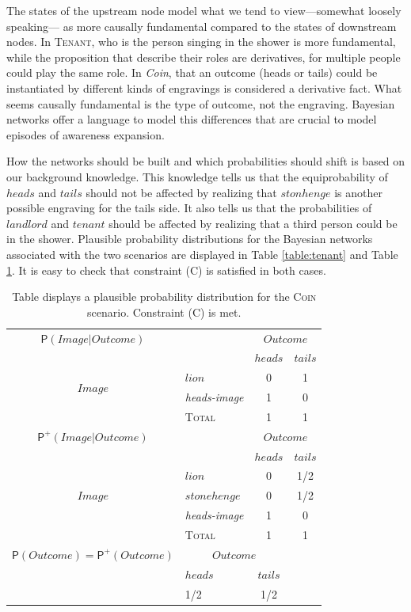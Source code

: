 \documentclass[
  11pt,
  dvipsnames,enabledeprecatedfontcommands]{scrartcl}
\newcommand{\pr}[1]{\ensuremath{\mathsf{P}(#1)}}
\newcommand{\ppr}[2]{\ensuremath{\mathsf{P}^{#1}(#2)}}
\begin{document}
The states of the upstream node model what we tend to view---somewhat
loosely speaking--- as more causally fundamental compared to the states
of downstream nodes. In \textsc{Tenant}, who is the person singing in
the shower is more fundamental, while the proposition that describe
their roles are derivatives, for multiple people could play the same
role. In \textit{Coin}, that an outcome (heads or tails) could be
instantiated by different kinds of engravings is considered a derivative
fact. What seems causally fundamental is the type of outcome, not the
engraving. Bayesian networks offer a language to model this differences
that are crucial to model episodes of awareness expansion.

How the networks should be built and which probabilities should shift is
based on our background knowledge. This knowledge tells us that the
equiprobability of \(heads\) and \(tails\) should not be affected by
realizing that \(stonhenge\) is another possible engraving for the tails
side. It also tells us that the probabilities of \(landlord\) and
\(tenant\) should be affected by realizing that a third person could be
in the shower. Plausible probability distributions for the Bayesian
networks associated with the two scenarios are displayed in Table
\ref{table:tenant} and Table \ref{table:coin}. It is easy to check that
constraint (C) is satisfied in both cases.

\begin{table}
\begin{tabular}{clcc}
$\pr{Image \vert Outcome}$ & & \multicolumn{2}{c}{$Outcome$} \\
 &   & $heads$ & $tails$ \\
\multirow{2}{*}{$Image$} & $lion$ & 0 & 1\\
& \textit{heads-image} & 1 & 0 \\
\hline
& \textsc{Total} & 1 & 1 \\
\hline
\hline
$\ppr{+}{Image \vert Outcome}$ & & \multicolumn{2}{c}{$Outcome$} \\
&  & $heads$ & $tails$ \\
\multirow{3}{*}{$Image$} & $lion$ & 0 & 1/2\\ 
& $stonehenge$ & 0 & 1/2 \\
& \textit{heads-image} & 1 & 0 \\
\hline
& \textsc{Total} & 1 & 1 \\
\hline
\hline
$\pr{Outcome}=\ppr{+}{Outcome}$ & \multicolumn{2}{c}{$Outcome$} & \\
&  $heads$ & $tails$ & \\
& 1/2 & 1/2 & \\
\end{tabular}
\caption{Table displays a plausible probability distribution for the \textsc{Coin} scenario. Constraint (C) is met.}
\label{table:coin}
\end{table}
\end{document}
